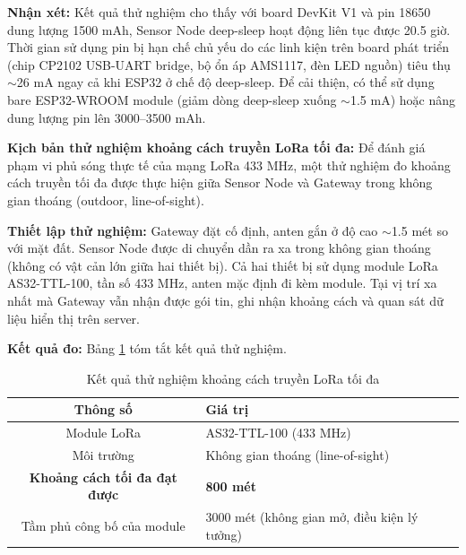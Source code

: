 \documentclass[../DoAn.tex]{subfiles}
\begin{document}

\textbf{Nhận xét:} Kết quả thử nghiệm cho thấy với board DevKit V1 và pin 18650 dung lượng 1500 mAh, Sensor Node deep-sleep hoạt động liên tục được 20.5 giờ. Thời gian sử dụng pin bị hạn chế chủ yếu do các linh kiện trên board phát triển (chip CP2102 USB-UART bridge, bộ ổn áp AMS1117, đèn LED nguồn) tiêu thụ $\sim$26 mA ngay cả khi ESP32 ở chế độ deep-sleep. Để cải thiện, có thể sử dụng bare ESP32-WROOM module (giảm dòng deep-sleep xuống $\sim$1.5 mA) hoặc nâng dung lượng pin lên 3000--3500 mAh.

\textbf{Kịch bản thử nghiệm khoảng cách truyền LoRa tối đa:} Để đánh giá phạm vi phủ sóng thực tế của mạng LoRa 433 MHz, một thử nghiệm đo khoảng cách truyền tối đa được thực hiện giữa Sensor Node và Gateway trong không gian thoáng (outdoor, line-of-sight).

\textbf{Thiết lập thử nghiệm:} Gateway đặt cố định, anten gắn ở độ cao $\sim$1.5 mét so với mặt đất. Sensor Node được di chuyển dần ra xa trong không gian thoáng (không có vật cản lớn giữa hai thiết bị). Cả hai thiết bị sử dụng module LoRa AS32-TTL-100, tần số 433 MHz, anten mặc định đi kèm module. Tại vị trí xa nhất mà Gateway vẫn nhận được gói tin, ghi nhận khoảng cách và quan sát dữ liệu hiển thị trên server.

\textbf{Kết quả đo:} Bảng \ref{table:lora_range} tóm tắt kết quả thử nghiệm.

\begin{table}[H]
\centering
\caption{Kết quả thử nghiệm khoảng cách truyền LoRa tối đa}
\label{table:lora_range}
\small
\begin{tabularx}{\textwidth}{|c|X|}
\hline
\textbf{Thông số} & \textbf{Giá trị} \\
\hline
Module LoRa & AS32-TTL-100 (433 MHz) \\
\hline
Môi trường & Không gian thoáng (line-of-sight) \\
\hline
\textbf{Khoảng cách tối đa đạt được} & \textbf{800 mét} \\
\hline
Tầm phủ công bố của module & 3000 mét (không gian mở, điều kiện lý tưởng) \\
\hline
\end{tabularx}
\end{table}
\end{document}
